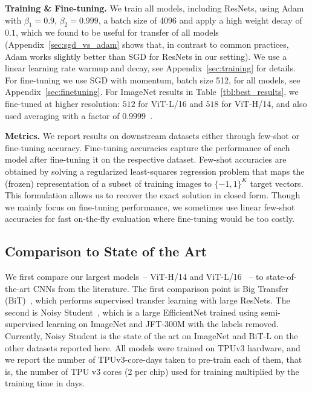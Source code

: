 \textbf{Training \& Fine-tuning.} We train all models, including ResNets, using Adam~\citep{kingma2015adam} with $\beta_1=0.9$, $\beta_2=0.999$, a batch size of 4096 and apply a high weight decay of $0.1$, which we found to be useful for transfer of all models (Appendix~\ref{sec:sgd_vs_adam} shows that, in contrast to common practices, Adam works slightly better than SGD for ResNets in our setting). We use a linear learning rate warmup and decay, see Appendix~\ref{sec:training} for details. For fine-tuning we use SGD with momentum, batch size 512, for all models, see Appendix~\ref{sec:finetuning}.
For ImageNet results in Table~\ref{tbl:best_results}, we fine-tuned at higher resolution: $512$ for ViT-L/16 and $518$ for ViT-H/14, and also used \citet{polyak} averaging with a factor of $0.9999$~\citep{ramachandran19-sasa,wang2020axial}.

\textbf{Metrics.}
We report results on downstream datasets either through few-shot or fine-tuning accuracy. Fine-tuning accuracies capture the performance of each model after fine-tuning it on the respective dataset. Few-shot accuracies are obtained by solving a regularized least-squares regression problem that maps the (frozen) representation of a subset of training images to $\{-1,1\}^K$ target vectors. This formulation allows us to recover the exact solution in closed form. Though we mainly focus on fine-tuning performance, we sometimes use linear few-shot accuracies for fast on-the-fly evaluation where fine-tuning would be too costly.

\subsection{Comparison to State of the Art}

We first compare our largest models~-- ViT-H/14 and ViT-L/16 ~-- to state-of-the-art CNNs from the literature. The first comparison point is Big Transfer (BiT)~\citep{kolesnikov2020-bit}, which performs supervised transfer learning with large ResNets. The second is Noisy Student~\citep{xie2020-noisystudent}, which is a large EfficientNet trained using semi-supervised learning on ImageNet and JFT-300M with the labels removed. Currently, Noisy Student is the state of the art on ImageNet and BiT-L on the other datasets reported here. All models were trained on TPUv3 hardware, and we report the number of TPUv3-core-days taken to pre-train each of them, that is, the number of TPU v3 cores (2 per chip) used for training multiplied by the training time in days.

